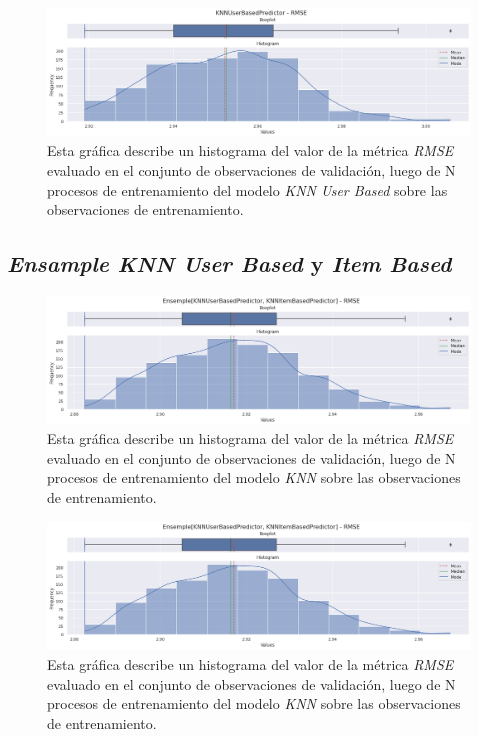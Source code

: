 \documentclass[11pt,a4paper,twoside]{thesis}
\begin{document}
{\begin{figure}[!htb]
	\centering
	\includegraphics[width=15cm]{./images/metrics-knn-user-based-RMSE.png}
	\caption{Esta gráfica describe un histograma del valor de la métrica \textit{RMSE} evaluado en el conjunto de observaciones de validación, luego de N procesos de entrenamiento del modelo \textit{KNN User Based} sobre las observaciones de entrenamiento.}
\end{figure}



\clearpage

\subsection{\textit{Ensample KNN User Based} y \textit{Item Based}}

\begin{figure}[!htb]
	\centering
	\includegraphics[width=15cm]{./images/metrics-knn-ensemple-RMSE.png}
	\caption{Esta gráfica describe un histograma del valor de la métrica \textit{RMSE} evaluado en el conjunto de observaciones de validación, luego de N procesos de entrenamiento del modelo \textit{KNN} sobre las observaciones de entrenamiento.}
\end{figure}

\begin{figure}[!htb]
	\centering
	\includegraphics[width=15cm]{./images/metrics-knn-ensemple-RMSE.png}
	\caption{Esta gráfica describe un histograma del valor de la métrica \textit{RMSE} evaluado en el conjunto de observaciones de validación, luego de N procesos de entrenamiento del modelo \textit{KNN} sobre las observaciones de entrenamiento.}
\end{figure}


}
\end{document}

